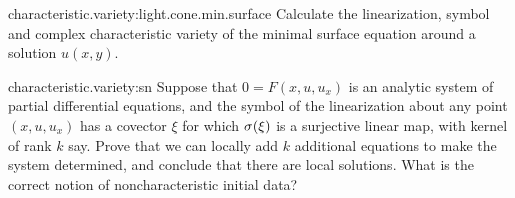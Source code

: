 \begin{problem}{characteristic.variety:light.cone.min.surface}
Calculate the linearization, symbol and complex characteristic variety of the minimal surface equation around a solution \(u(x,y)\).
\end{problem}
\begin{problem}{characteristic.variety:sn}
Suppose that \(0=F(x,u,u_x)\) is an analytic system of partial differential equations, and the symbol of the linearization about any point \((x,u,u_x)\) has a covector \(\xi\) for which \(\opsymbol[]{\xi}\) is a surjective linear map, with kernel of rank \(k\) say.
Prove that we can locally add \(k\) additional equations to make the system determined, and conclude that there are local solutions.
What is the correct notion of noncharacteristic initial data?
\end{problem}